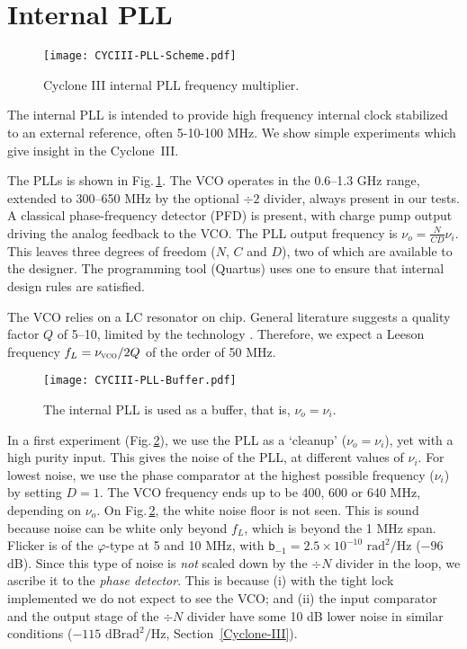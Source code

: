 \documentclass{article}
\newcommand{\unit}[1]{\ensuremath{\mathrm{#1}}}
\begin{document}
\section{Internal PLL}\label{sec:PLL}
\begin{figure}
\centering\texttt{[image: CYCIII-PLL-Scheme.pdf]}
\caption{Cyclone III internal PLL frequency multiplier.}
\label{fig:CYCIII-PLL-Scheme}
\end{figure}

The internal PLL is intended to provide high frequency internal clock stabilized to an external reference, often 5-10-100 MHz.
We show simple experiments which give insight in the Cyclone~III.

The PLLs is shown in Fig.\,\ref{fig:CYCIII-PLL-Scheme}.  The VCO operates in the 0.6--1.3 GHz range, extended to 300--650 MHz by the optional $\div2$ divider, always present in our tests.
A classical phase-frequency detector (PFD) is present, with charge pump output driving the analog feedback to the VCO\@.
The PLL output frequency is $\nu_o=\frac{N}{CD}\nu_i$.  This leaves three degrees of freedom ($N$, $C$ and $D$), two of which are available to the designer.  The programming tool (Quartus) uses one to ensure that internal design rules are satisfied.

The VCO relies on a LC resonator on chip.  General literature suggests a quality factor $Q$ of 5--10, limited by the technology \cite{Hajimiri-1999}.  Therefore, we expect a Leeson frequency $f_L=\nu_\textsc{vco}/2Q$ of the order of 50 MHz.  



\begin{figure}[t]
\centering\texttt{[image: CYCIII-PLL-Buffer.pdf]}
\caption{The internal PLL is used as a buffer, that is, $\nu_o=\nu_i$.}
\label{fig:CYCIII-PLL-Buffer}
\end{figure}
In a first experiment (Fig.\,\ref{fig:CYCIII-PLL-Buffer}), we use the PLL as a `cleanup' ($\nu_o=\nu_i$), yet with a high purity input.   This gives the noise of the PLL, at different values of $\nu_i$.  
For lowest noise, we use the phase comparator at the highest possible frequency ($\nu_i$) by setting $D=1$.
The VCO frequency ends up to be 400, 600 or 640 MHz, depending on $\nu_o$.
On Fig.\,\ref{fig:CYCIII-PLL-Buffer}, the white noise floor is not seen.  This is sound because noise can be white only beyond $f_L$, which is beyond the 1 MHz span.
Flicker is of the $\varphi$-type at 5 and 10 MHz, with $\mathsf{b}_{-1}=2.5{\times}10^{-10}$ \unit{rad^2/Hz} ($-96$ dB).  Since this type of noise is \emph{not} scaled down by the $\div N$ divider in the loop, we ascribe it to the \emph{phase detector}. 
This is because (i) with the tight lock implemented we do not expect to see the VCO; and (ii) the input comparator and the output stage of the $\div N$ divider have some 10 dB lower noise in similar conditions ($-115$ \unit{dBrad^2/Hz}, Section~\ref{Cyclone-III}).
\end{document}
